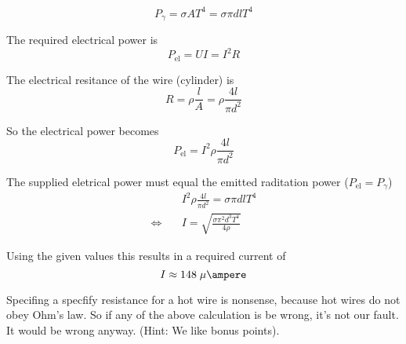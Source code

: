 \documentclass[a4paper,german,12pt,smallheadings]{scrartcl}
\begin{document}
\begin{enumerate}[a)]
    \begin{equation*}
      P_\gamma = \sigma A T^4 = \sigma \pi d l T^4
    \end{equation*}

    The required electrical power is
    \begin{equation*}
      P_\text{el} = UI = I^2R
    \end{equation*}

    The electrical resitance of the wire (cylinder) is
    \begin{equation*}
      R = \rho \frac{l}{A} = \rho \frac{4l}{\pi d^2}
    \end{equation*}

    So the electrical power becomes
    \begin{equation*}
      P_\text{el} = I^2 \rho \frac{4l}{\pi d^2}
    \end{equation*}

    The supplied eletrical power must equal the emitted raditation power ($P_\text{el} = P_\gamma$)
    \begin{align*}
      &\quad I^2 \rho \frac{4l}{\pi d^2} = \sigma \pi d l T^4 \\
      \Leftrightarrow&\quad I = \sqrt{\frac{\sigma \pi^2 d^3 T^4}{4 \rho}}
    \end{align*}

    Using the given values this results in a required current of
    \begin{equation*}
      I \approx 148 \; \mu\ampere
    \end{equation*}

    Specifing a specfify resistance for a hot wire is nonsense, because hot
    wires do not obey Ohm's law. So if any of the above calculation is be
    wrong, it's not our fault. It would be wrong anyway. (Hint: We like bonus
    points).
\end{enumerate}
\end{document}
